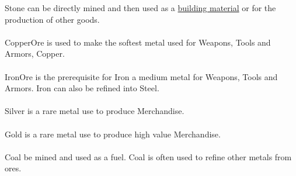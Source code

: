 \Gls*{Stone} can be directly mined and then used as a
\hyperref[ch:Goods:Materials]{building material}
or for the production of other goods.

\paragraph{}

\Gls*{CopperOre} is used to make the softest metal used for \glspl{Weapon}, \glspl{Tool} and \glspl{Armor}, \gls{Copper}.

\paragraph{}

\Gls*{IronOre} is the prerequisite for \gls{Iron} a medium metal for \glspl{Weapon}, \glspl{Tool} and \glspl{Armor}.
\Gls{Iron} can also be refined into \Gls{Steel}.

\paragraph{}

\Gls*{Silver} is a rare metal use to produce \gls{Merchandise}.

\paragraph{}

\Gls*{Gold} is a rare metal use to produce high value \gls{Merchandise}.

\paragraph{}

\Gls*{Coal} be mined and used as a fuel. \Gls*{Coal} is often used to refine other metals from ores.

